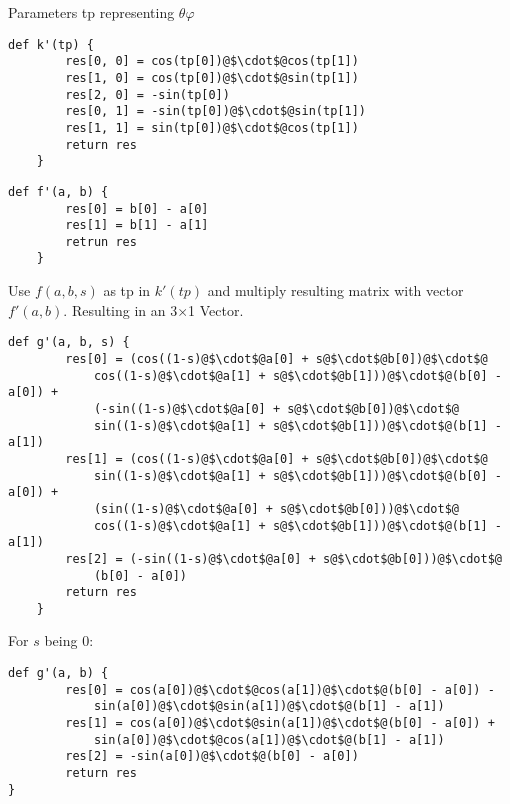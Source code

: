 Parameters tp representing $\theta\varphi$
\begin{lstlisting}[escapechar=@]
    def k'(tp) {
        res[0, 0] = cos(tp[0])@$\cdot$@cos(tp[1])
        res[1, 0] = cos(tp[0])@$\cdot$@sin(tp[1])
        res[2, 0] = -sin(tp[0])
        res[0, 1] = -sin(tp[0])@$\cdot$@sin(tp[1])
        res[1, 1] = sin(tp[0])@$\cdot$@cos(tp[1])
        return res
    }
\end{lstlisting}
\begin{lstlisting}[escapechar=@]
    def f'(a, b) {
        res[0] = b[0] - a[0]
        res[1] = b[1] - a[1]
        retrun res
    }
\end{lstlisting}
Use $f(a, b, s)$ as tp in $k'(tp)$ and multiply resulting matrix with vector $f'(a, b)$. Resulting in an 3$\times$1 Vector.
\begin{lstlisting}[escapechar=@]
    def g'(a, b, s) {
        res[0] = (cos((1-s)@$\cdot$@a[0] + s@$\cdot$@b[0])@$\cdot$@
            cos((1-s)@$\cdot$@a[1] + s@$\cdot$@b[1]))@$\cdot$@(b[0] - a[0]) +
            (-sin((1-s)@$\cdot$@a[0] + s@$\cdot$@b[0])@$\cdot$@
            sin((1-s)@$\cdot$@a[1] + s@$\cdot$@b[1]))@$\cdot$@(b[1] - a[1])
        res[1] = (cos((1-s)@$\cdot$@a[0] + s@$\cdot$@b[0])@$\cdot$@
            sin((1-s)@$\cdot$@a[1] + s@$\cdot$@b[1]))@$\cdot$@(b[0] - a[0]) +
            (sin((1-s)@$\cdot$@a[0] + s@$\cdot$@b[0]))@$\cdot$@
            cos((1-s)@$\cdot$@a[1] + s@$\cdot$@b[1]))@$\cdot$@(b[1] - a[1])
        res[2] = (-sin((1-s)@$\cdot$@a[0] + s@$\cdot$@b[0]))@$\cdot$@
            (b[0] - a[0])
        return res
    }
\end{lstlisting}
\pagebreak
For $s$ being $0$:
\begin{lstlisting}[escapechar=@]
    def g'(a, b) {
        res[0] = cos(a[0])@$\cdot$@cos(a[1])@$\cdot$@(b[0] - a[0]) -
            sin(a[0])@$\cdot$@sin(a[1])@$\cdot$@(b[1] - a[1])
        res[1] = cos(a[0])@$\cdot$@sin(a[1])@$\cdot$@(b[0] - a[0]) +
            sin(a[0])@$\cdot$@cos(a[1])@$\cdot$@(b[1] - a[1])
        res[2] = -sin(a[0])@$\cdot$@(b[0] - a[0])
        return res
}
\end{lstlisting}